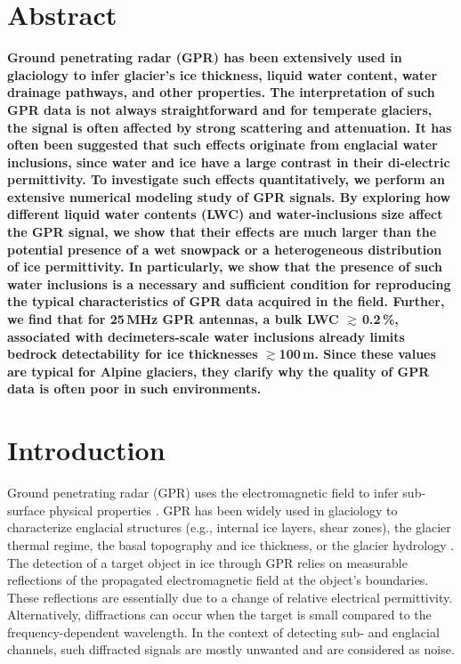 \section{Abstract}

\textbf{Ground penetrating radar (GPR) has been extensively used in glaciology to infer glacier's ice thickness, liquid water content, water drainage pathways, and other properties. The interpretation of such GPR data is not always straightforward and for temperate glaciers, the signal is often affected by strong scattering and attenuation. It has often been suggested that such effects originate from englacial water inclusions, since water and ice  have a large contrast in their di-electric permittivity. To investigate such effects quantitatively, we perform an extensive numerical modeling study of GPR signals. By exploring how different liquid water contents (LWC) and water-inclusions size affect the GPR signal, we show that their effects are much larger than the potential presence of a wet snowpack or a heterogeneous distribution of ice permittivity. In particularly, we show that the presence of such water inclusions is a necessary and sufficient condition for reproducing the typical characteristics of GPR data acquired in the field. Further, we find that for 25\,MHz GPR antennas, a bulk LWC $\gtrsim $\,0.2\,\%, associated with decimeters-scale water inclusions already limits bedrock detectability for ice thicknesses $\gtrsim$100\,m. Since these values are typical for Alpine glaciers, they clarify why the quality of GPR data is often poor in such environments.}


\section{Introduction} 

Ground penetrating radar (GPR) uses the electromagnetic field to infer sub-surface physical properties \citep{Davis&Annan1989}. GPR has been widely used in glaciology to characterize englacial structures (e.g., internal ice layers, shear zones), the glacier thermal regime, the basal topography and ice thickness, or the glacier hydrology \citep[see][for reviews]{Woodward&Burke2007,Plewes&Hubbard2001,Navarro&Eisen2009,Schroeder&al2020}. The detection of a target object in ice through GPR relies on measurable reflections of the propagated electromagnetic field at the object's boundaries. These reflections are essentially due to a change of relative electrical permittivity. Alternatively, diffractions can occur when the target is small compared to the frequency-dependent wavelength. In the context of detecting sub- and englacial channels, such diffracted signals are mostly unwanted and are considered as noise. 

